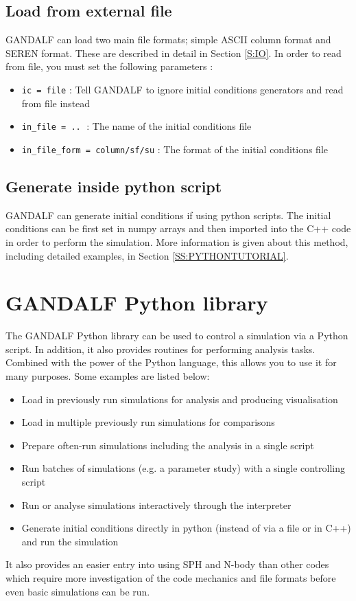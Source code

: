 \documentclass[a4paper]{article}
\newcommand{\var}[1]{\texttt{#1}}
\begin{document}
\subsection{Load from external file}
GANDALF can load two main file formats; simple ASCII column format and SEREN format.  These are described in detail in Section \ref{S:IO}.  In order to read from file, you must set the following parameters : 
\begin{itemize}
\item \var{ic = file} : Tell GANDALF to ignore initial conditions generators and read from file instead
\item \var{in\_file = ..}$\;$ : The name of the initial conditions file
\item \var{in\_file\_form = column/sf/su} : The format of the initial conditions file
\end{itemize}

\subsection{Generate inside python script}
GANDALF can generate initial conditions if using python scripts.  The initial conditions can be first set in numpy arrays and then imported into the C++ code in order to perform the simulation.  More information is given about this method, including detailed examples, in Section \ref{SS:PYTHONTUTORIAL}.


\newpage



\section{GANDALF Python library} \label{S:PYTHONSCRIPT}

The GANDALF Python library can be used to control a simulation via a Python script. In addition, it also provides routines for performing analysis tasks. Combined with the power of the Python language, this allows you to use it for many purposes. Some examples are listed below:
\begin{itemize}
\item Load in previously run simulations for analysis and producing visualisation
\item Load in multiple previously run simulations for comparisons
\item Prepare often-run simulations including the analysis in a single script
\item Run batches of simulations (e.g. a parameter study) with a single controlling script
\item Run or analyse simulations interactively through the interpreter
\item Generate initial conditions directly in python (instead of via a file or in C++) and run the simulation
\end{itemize}
It also provides an easier entry into using SPH and N-body than other codes which require more investigation of the code mechanics and file formats before even basic simulations can be run.
\end{document}
